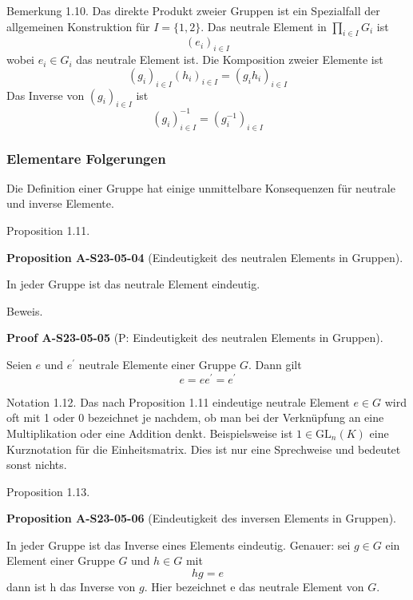 \documentclass[10pt, letterpaper]{article}
\newcommand{\CustomHeading}[3]{%
  \par\medskip\noindent%
  \textbf{#1 #2} \textnormal{(#3)}.\enskip%
}
\newenvironment{PROP}[2]{\begin{unitbox}\CustomHeading{Proposition}{#1}{#2}}{\end{unitbox}}
\newenvironment{PROOF}[2]{\begin{unitbox}\CustomHeading{Proof}{#1}{#2}}{\end{unitbox}}
\begin{document}
Bemerkung 1.10. Das direkte Produkt zweier Gruppen ist ein Spezialfall der allgemeinen Konstruktion für $I=\{1,2\}$. Das neutrale Element in $\prod_{i \in I} G_{i}$ ist
$$
\left(e_{i}\right)_{i \in I}
$$
wobei $e_{i} \in G_{i}$ das neutrale Element ist. Die Komposition zweier Elemente ist
$$
\left(g_{i}\right)_{i \in I}\left(h_{i}\right)_{i \in I}=\left(g_{i} h_{i}\right)_{i \in I}
$$
Das Inverse von $\left(g_{i}\right)_{i \in I}$ ist
$$
\left(g_{i}\right)_{i \in I}^{-1}=\left(g_{i}^{-1}\right)_{i \in I}
$$







\subsubsection{Elementare Folgerungen} 

Die Definition einer Gruppe hat einige unmittelbare Konsequenzen für neutrale und inverse Elemente.

Proposition 1.11. 

\begin{PROP}{A-S23-05-04}{Eindeutigkeit des neutralen Elements in Gruppen}
In jeder Gruppe ist das neutrale Element eindeutig.
\end{PROP}


Beweis. 

\begin{PROOF}{A-S23-05-05}{P: Eindeutigkeit des neutralen Elements in Gruppen}
Seien $e$ und $e^{\prime}$ neutrale Elemente einer Gruppe $G$. Dann gilt
$$
e=e e^{\prime}=e^{\prime}
$$
\end{PROOF}

Notation 1.12. Das nach Proposition 1.11 eindeutige neutrale Element $e \in G$ wird oft mit 1 oder 0 bezeichnet je nachdem, ob man bei der Verknüpfung an eine Multiplikation oder eine Addition denkt. Beispielsweise ist $1 \in \mathrm{GL}_{n}(K)$ eine Kurznotation für die Einheitsmatrix. Dies ist nur eine Sprechweise und bedeutet sonst nichts.

Proposition 1.13. 


\begin{PROP}{A-S23-05-06}{Eindeutigkeit des inversen Elements in Gruppen}
In jeder Gruppe ist das Inverse eines Elements eindeutig. Genauer: sei $g \in G$ ein Element einer Gruppe $G$ und $h \in G$ mit
$$
h g=e
$$
dann ist h das Inverse von $g$. Hier bezeichnet e das neutrale Element von $G$.
\end{PROP}
\end{document}
